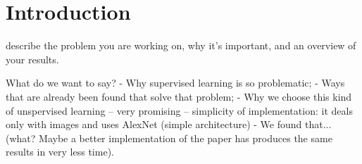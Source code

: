 \section{Introduction}
describe the problem you are working on, why it's important, and an overview of your results.

What do we want to say?
- Why supervised learning is so problematic;
- Ways that are already been found that solve that problem;
- Why we choose this kind of unspervised learning
-- very promising
-- simplicity of implementation: it deals only with images and uses AlexNet (simple architecture)
- We found that... (what? Maybe a better implementation of the paper has produces the same results in very less time).

